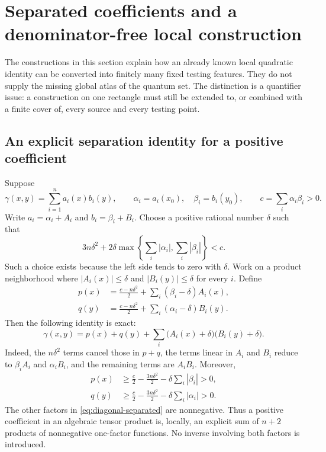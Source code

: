 \section{Separated coefficients and a denominator-free local construction}
\label{sec:diagonal-local}

The constructions in this section explain how an already known local
quadratic identity can be converted into finitely many fixed testing
features. They do not supply the missing global atlas of the quantum set.
The distinction is a quantifier issue: a construction on one rectangle
must still be extended to, or combined with a finite cover of, every
source and every testing point.

\subsection{An explicit separation identity for a positive coefficient}

Suppose
\[
 \gamma(x,y)=\sum_{i=1}^{n}a_i(x)b_i(y),\qquad
 \alpha_i=a_i(x_0),\quad \beta_i=b_i(y_0),\qquad
 c=\sum_i\alpha_i\beta_i>0.
\]
Write $a_i=\alpha_i+A_i$ and $b_i=\beta_i+B_i$. Choose a positive
rational number $\delta$ such that
\begin{equation}
 3n\delta^2+2\delta
 \max\left\{\sum_i|\alpha_i|,\sum_i|\beta_i|\right\}<c.
 \label{eq:diagonal-delta}
\end{equation}
Such a choice exists because the left side tends to zero with $\delta$.
Work on a product neighborhood where
$|A_i(x)|\le\delta$ and $|B_i(y)|\le\delta$ for every $i$. Define
\begin{align}
 p(x)&=\frac{c-n\delta^2}{2}
       +\sum_i(\beta_i-\delta)A_i(x),\nonumber\\
 q(y)&=\frac{c-n\delta^2}{2}
       +\sum_i(\alpha_i-\delta)B_i(y).
 \label{eq:diagonal-pq}
\end{align}
Then the following identity is exact:
\begin{equation}
 \boxed{\gamma(x,y)=p(x)+q(y)
   +\sum_i\bigl(A_i(x)+\delta\bigr)
              \bigl(B_i(y)+\delta\bigr).}
 \label{eq:diagonal-separated}
\end{equation}
Indeed, the $n\delta^2$ terms cancel those in $p+q$, the terms linear
in $A_i$ and $B_i$ reduce to $\beta_iA_i$ and $\alpha_iB_i$, and the
remaining terms are $A_iB_i$. Moreover,
\begin{align*}
 p(x)&\ge \frac c2-\frac{3n\delta^2}{2}
                      -\delta\sum_i|\beta_i|>0,\\
 q(y)&\ge \frac c2-\frac{3n\delta^2}{2}
                      -\delta\sum_i|\alpha_i|>0.
\end{align*}
The other factors in \eqref{eq:diagonal-separated} are nonnegative.
Thus a positive coefficient in an algebraic tensor product is, locally,
an explicit sum of $n+2$ products of nonnegative one-factor functions.
No inverse involving both factors is introduced.

